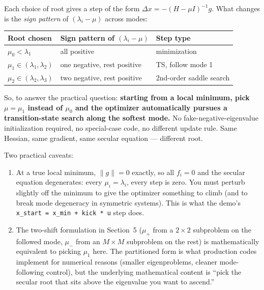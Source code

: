 \documentclass[11pt]{article}
\newcommand{\dx}{\Delta x}
\begin{document}
Each choice of root gives a step of the form $\dx = -(H - \mu I)^{-1} g$.
What changes is the \emph{sign pattern} of $(\lambda_i - \mu)$ across modes:

\begin{center}
\begin{tabular}{l l l}
\hline
Root chosen & Sign pattern of $(\lambda_i - \mu)$ & Step type \\
\hline
$\mu_0 < \lambda_1$            & all positive             & minimization \\
$\mu_1 \in (\lambda_1, \lambda_2)$ & one negative, rest positive  & TS, follow mode 1 \\
$\mu_2 \in (\lambda_2, \lambda_3)$ & two negative, rest positive  & 2nd-order saddle search \\
\hline
\end{tabular}
\end{center}

So, to answer the practical question: \textbf{starting from a local minimum,
pick $\mu = \mu_1$ instead of $\mu_0$ and the optimizer automatically pursues
a transition-state search along the softest mode.}  No fake-negative-eigenvalue
initialization required, no special-case code, no different update rule.
Same Hessian, same gradient, same secular equation --- different root.

Two practical caveats:

\begin{enumerate}
  \item At a true local minimum, $\|g\| = 0$ exactly, so all $f_i = 0$ and
        the secular equation degenerates: every $\mu_i = \lambda_i$, every step
        is zero.  You must perturb slightly off the minimum to give the
        optimizer something to climb (and to break mode degeneracy in
        symmetric systems).  This is what the demo's
        \texttt{x\_start = x\_min + kick * u} step does.
  \item The two-shift formulation in Section~5 ($\mu_+$ from a $2 \times 2$
        subproblem on the followed mode, $\mu_-$ from an $M \times M$
        subproblem on the rest) is mathematically equivalent to picking
        $\mu_1$ here.  The partitioned form is what production codes
        implement for numerical reasons (smaller eigenproblems, cleaner
        mode-following control), but the underlying mathematical content is
        ``pick the secular root that sits above the eigenvalue you want to
        ascend.''
\end{enumerate}
\end{document}
